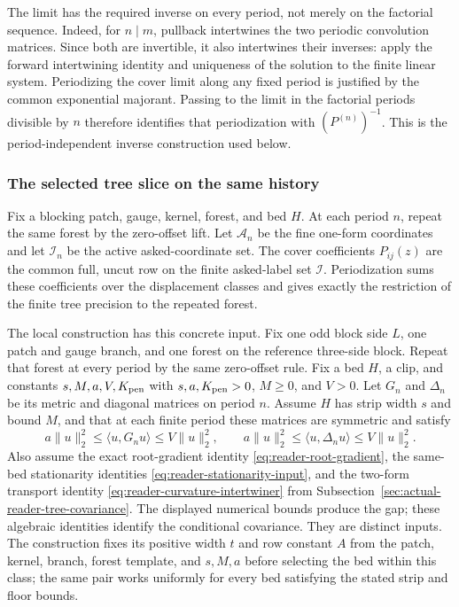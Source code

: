 The limit has the required inverse on every period, not merely on the
factorial sequence. Indeed, for $n\mid m$, pullback intertwines the two
periodic convolution matrices. Since both are invertible, it also
intertwines their inverses: apply the forward intertwining identity and
uniqueness of the solution to the finite linear system. Periodizing the
cover limit along any fixed period is justified by the common exponential
majorant. Passing to the limit in the factorial periods divisible by $n$
therefore identifies that periodization with $(P^{(n)})^{-1}$. This is the
period-independent inverse construction used below.

\subsubsection{The selected tree slice on the same history}

Fix a blocking patch, gauge, kernel, forest, and bed $H$. At each period
$n$, repeat the same forest by the zero-offset lift. Let $\mathcal A_n$
be the fine one-form coordinates and let $\mathcal I_n$ be the active
asked-coordinate set. The cover coefficients $P_{ij}(z)$ are the common
full, uncut row on the finite asked-label set $\mathcal I$. Periodization
sums these coefficients over the displacement classes and gives exactly
the restriction of the finite tree precision to the repeated forest.

The local construction has this concrete input. Fix one odd block side
$L$, one patch and gauge branch, and one forest on the reference three-side
block. Repeat that forest at every period by the same zero-offset rule.
Fix a bed $H$, a clip, and constants $s,M,a,V,K_{\rm pen}$ with
$s,a,K_{\rm pen}>0$, $M\ge0$, and $V>0$. Let $G_n$ and $\Delta_n$ be its metric and diagonal matrices
on period $n$. Assume $H$ has strip width $s$ and bound $M$, and that at
each finite period these matrices are symmetric and satisfy
\[
 a\|u\|_2^2\le \langle u,G_nu\rangle\le V\|u\|_2^2,
 \qquad
 a\|u\|_2^2\le \langle u,\Delta_nu\rangle\le V\|u\|_2^2.
\]
Also assume the exact root-gradient identity
\eqref{eq:reader-root-gradient}, the same-bed stationarity identities
\eqref{eq:reader-stationarity-input}, and the two-form transport identity
\eqref{eq:reader-curvature-intertwiner} from
Subsection~\ref{sec:actual-reader-tree-covariance}. The displayed numerical
bounds produce the gap; these algebraic identities identify the
conditional covariance. They are distinct inputs. The construction fixes
its positive width $t$ and row constant $A$ from the patch, kernel, branch,
forest template, and $s,M,a$ before selecting the bed within this class;
the same pair works uniformly for every bed satisfying the stated strip
and floor bounds.

